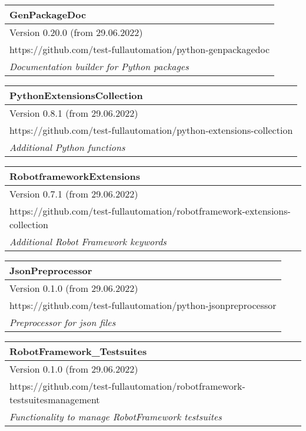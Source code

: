 \begin{center}
\begin{tabular}{| m{44em} |}\hline
   \textbf{GenPackageDoc}\\ \hline
   Version 0.20.0 (from 29.06.2022)\\ \hline
   https://github.com/test-fullautomation/python-genpackagedoc\\ \hline
   \textit{Documentation builder for Python packages}\\ \hline
\end{tabular}

\vspace{2ex}

\begin{tabular}{| m{44em} |}\hline
   \textbf{PythonExtensionsCollection}\\ \hline
   Version 0.8.1 (from 29.06.2022)\\ \hline
   https://github.com/test-fullautomation/python-extensions-collection\\ \hline
   \textit{Additional Python functions}\\ \hline
\end{tabular}

\vspace{2ex}

\begin{tabular}{| m{44em} |}\hline
   \textbf{RobotframeworkExtensions}\\ \hline
   Version 0.7.1 (from 29.06.2022)\\ \hline
   https://github.com/test-fullautomation/robotframework-extensions-collection\\ \hline
   \textit{Additional Robot Framework keywords}\\ \hline
\end{tabular}

\vspace{2ex}

\begin{tabular}{| m{44em} |}\hline
   \textbf{JsonPreprocessor}\\ \hline
   Version 0.1.0 (from 29.06.2022)\\ \hline
   https://github.com/test-fullautomation/python-jsonpreprocessor\\ \hline
   \textit{Preprocessor for json files}\\ \hline
\end{tabular}

\vspace{2ex}

\begin{tabular}{| m{44em} |}\hline
   \textbf{RobotFramework\_Testsuites}\\ \hline
   Version 0.1.0 (from 29.06.2022)\\ \hline
   https://github.com/test-fullautomation/robotframework-testsuitesmanagement\\ \hline
   \textit{Functionality to manage RobotFramework testsuites}\\ \hline
\end{tabular}

\vspace{2ex}

\end{center}

